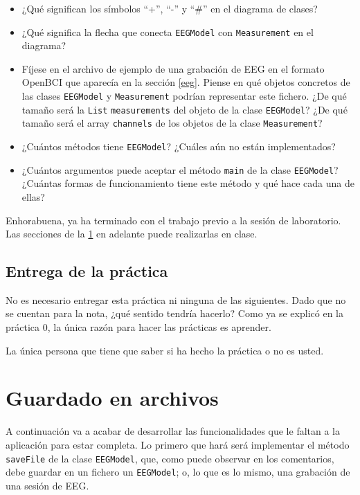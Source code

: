 \documentclass[10pt,a4paper,spanish]{article}
\newcommand{\code}[1]{\texttt{#1}}
\begin{document}
\begin{itemize}
    \item ¿Qué significan los símbolos ``+'', ``-'' y ``\#'' en el diagrama de clases?
    \item ¿Qué significa la flecha que conecta \code{EEGModel} con \code{Measurement} en el diagrama?
    \item Fíjese en el archivo de ejemplo de una grabación de EEG en el formato OpenBCI que aparecía en la sección \ref{eeg}. Piense en qué objetos concretos de las clases \code{EEGModel} y \code{Measurement} podrían representar este fichero. ¿De qué tamaño será la \code{List} \code{measurements} del objeto de la clase \code{EEGModel}? ¿De qué tamaño será el array \code{channels} de los objetos de la clase \code{Measurement}?
    \item ¿Cuántos métodos tiene \code{EEGModel}? ¿Cuáles aún no están implementados?
    \item ¿Cuántos argumentos puede aceptar el método \code{main} de la clase \code{EEGModel}? ¿Cuántas formas de funcionamiento tiene este método y qué hace cada una de ellas?
\end{itemize}

Enhorabuena, ya ha terminado con el trabajo previo a la sesión de laboratorio. Las secciones de la \ref{laboratorio} en adelante puede realizarlas en clase.

\subsection{Entrega de la práctica}

No es necesario entregar esta práctica ni ninguna de las siguientes. Dado que no se cuentan para la nota, ¿qué sentido tendría hacerlo? Como ya se explicó en la práctica 0, la única razón para hacer las prácticas es aprender.

La única persona que tiene que saber si ha hecho la práctica o no es usted.

\section{Guardado en archivos}
\label{laboratorio}

A continuación va a acabar de desarrollar las funcionalidades que le faltan a la aplicación para estar completa. Lo primero que hará será implementar el método \code{saveFile} de la clase \code{EEGModel}, que, como puede observar en los comentarios, debe guardar en un fichero un \code{EEGModel}; o, lo que es lo mismo, una grabación de una sesión de EEG.
\end{document}
